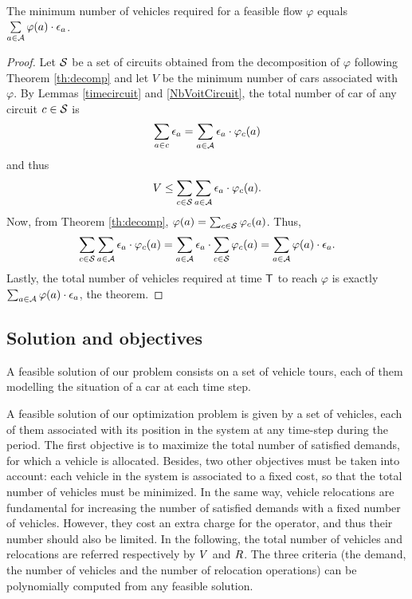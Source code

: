 \begin{theorem} \label{NbVoiture}
The minimum number of vehicles required for a feasible flow $\varphi$ equals $\sum\limits_{a\in \mathcal{A}} \varphi(a) \cdot \epsilon_a$.
\end{theorem}
\begin{proof}
Let ${\cal S}$ be a set of circuits obtained from the decomposition of $\varphi$ following Theorem \ref{th:decomp} and let $V$ be the minimum number of cars associated with $\varphi$.
By Lemmas \ref{timecircuit} and \ref{NbVoitCircuit}, the total number of car of any circuit $c \in {\cal S}$ is
\[\sum_{a\in c} \epsilon_a = \sum_{a\in \mathcal{A}} \epsilon_a \cdot \varphi_c(a)\]
and thus
\[V \leq \sum_{c\in {\cal S}} \sum_{a\in \mathcal{A}} \epsilon_a \cdot \varphi_c(a).\]
Now, from  Theorem \ref{th:decomp}, $\varphi (a)= \sum_{c\in {\cal S}}\varphi_c(a)$.
Thus, 
\[\sum_{c\in {\cal S}} \sum_{a\in \mathcal{A}} \epsilon_a \cdot \varphi_c(a)=\sum_{a\in \mathcal{A}} \epsilon_a \cdot \sum_{c\in {\cal S}}  \varphi_c(a)=\sum_{a\in \mathcal{A}} \varphi(a) \cdot \epsilon_a.\]
Lastly, the total number of vehicles required at time $\mathsf{T}$ to reach $\varphi$ is exactly $\sum_{a\in \mathcal{A}} \varphi(a) \cdot \epsilon_a$, the theorem.
\end{proof}

\subsection{Solution and objectives}
A feasible solution of our problem consists on a set of vehicle tours, each of them modelling the situation of a car at each time step.

\medskip
A feasible solution of our optimization problem is given by a set of vehicles, each of them associated with its position in the system at any time-step during the period.
The first objective is to maximize the total number of satisfied demands, \ie for which a vehicle is allocated.
Besides, two other objectives must be taken into account: each vehicle in the system is associated to a fixed cost, so that the total number of vehicles must be minimized. 
In the same way, vehicle relocations are fundamental for increasing the number of satisfied demands with a fixed  number of vehicles.
However, they cost an extra charge for the operator, and thus their number should also be limited.
In the following, the total number of vehicles and relocations are referred respectively by $V$ and $R$.
The three criteria (the demand, the number of vehicles and the number of relocation operations) can be polynomially computed from any feasible solution.

